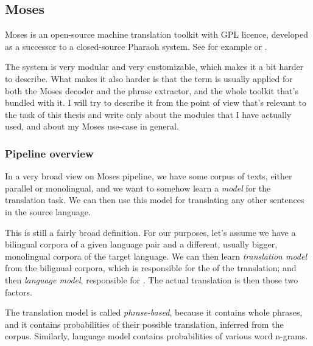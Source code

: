 
\subsection{Moses}
\label{moses}
Moses is an open-source machine translation toolkit with GPL licence, developed as a successor to a closed-source Pharaoh system. See for example \cite{mosespaper} or \cite{moseslink}.

The system is very modular and very customizable, which makes it a bit harder to describe. What makes it also harder is that the term  is usually applied for both the  Moses decoder and the phrase extractor, and the whole toolkit that's bundled with it. I will try to describe it from the point of view that's relevant to the task of this thesis and write only about the modules that I have actually used, and about my Moses use-case in general.



\subsubsection{Pipeline overview}
In a very broad view on Moses pipeline, we have some corpus of texts, either parallel or monolingual, and we want to somehow learn a \emph{model} for the translation task. We can then use this model for translating any other sentences in the source language.

This is still a fairly broad definition. For our purposes, let's assume we have a bilingual corpora of a given language pair and a different, usually bigger, monolingual corpora of the target language. We can then learn \emph{translation model} from the bilignual corpora, which is responsible for the  of the translation; and then \emph{language model}, responsible for . The actual translation is then  those two factors.

The translation model is called \emph{phrase-based}, because it contains whole phrases, and it contains probabilities of their possible translation, inferred from the corpus. 
Similarly, language model contains probabilities of various word n-grams. 

